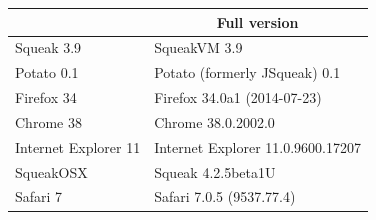 {\footnotesize
\begin{tabular}{ll}
\toprule
\multicolumn{1}{l}{ }&\multicolumn{1}{c}{Full version}\tabularnewline
\midrule
Squeak 3.9&SqueakVM 3.9\tabularnewline
Potato 0.1&Potato (formerly JSqueak) 0.1\tabularnewline
Firefox 34&Firefox 34.0a1 (2014-07-23)\tabularnewline
Chrome 38&Chrome 38.0.2002.0\tabularnewline
Internet Explorer 11&Internet Explorer 11.0.9600.17207\tabularnewline
SqueakOSX&Squeak 4.2.5beta1U\tabularnewline
Safari 7&Safari 7.0.5 (9537.77.4)\tabularnewline
\bottomrule
\end{tabular}}
